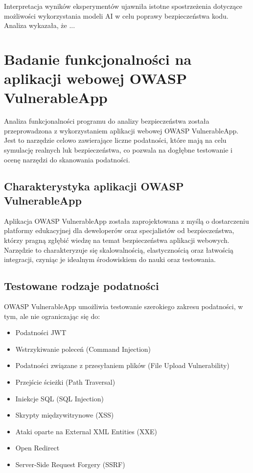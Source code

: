 Interpretacja wyników eksperymentów ujawniła istotne spostrzeżenia dotyczące możliwości wykorzystania modeli AI w celu poprawy bezpieczeństwa kodu. Analiza wykazała, że ...


\section{Badanie funkcjonalności na aplikacji webowej OWASP VulnerableApp}
\label{sec:badania_na_aplikacji_webowej_owasp}

Analiza funkcjonalności programu do analizy bezpieczeństwa została przeprowadzona z wykorzystaniem aplikacji webowej OWASP VulnerableApp. Jest to narzędzie celowo zawierające liczne podatności, które mają na celu symulację realnych luk bezpieczeństwa, co pozwala na dogłębne testowanie i ocenę narzędzi do skanowania podatności.

\subsection{Charakterystyka aplikacji OWASP VulnerableApp}
Aplikacja OWASP VulnerableApp została zaprojektowana z myślą o dostarczeniu platformy edukacyjnej dla deweloperów oraz specjalistów od bezpieczeństwa, którzy pragną zgłębić wiedzę na temat bezpieczeństwa aplikacji webowych. Narzędzie to charakteryzuje się skalowalnością, elastycznością oraz łatwością integracji, czyniąc je idealnym środowiskiem do nauki oraz testowania.

\subsection{Testowane rodzaje podatności}
OWASP VulnerableApp umożliwia testowanie szerokiego zakresu podatności, w tym, ale nie ograniczając się do:

\begin{itemize}
    \item Podatności JWT
    \item Wstrzykiwanie poleceń (Command Injection)
    \item Podatności związane z przesyłaniem plików (File Upload Vulnerability)
    \item Przejście ścieżki (Path Traversal)
    \item Iniekcje SQL (SQL Injection)
    \item Skrypty międzywitrynowe (XSS)
    \item Ataki oparte na External XML Entities (XXE)
    \item Open Redirect
    \item Server-Side Request Forgery (SSRF)
\end{itemize}

